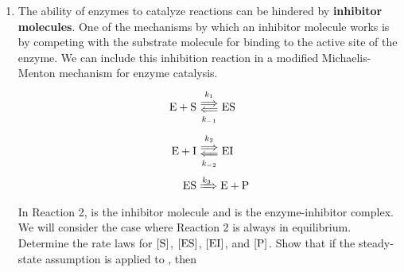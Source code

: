 \documentclass[../psets.tex]{subfiles}
\begin{document}
\begin{enumerate}[label={\textbf{29-\arabic*.}},leftmargin=3.5em]
\begin{proof}[Answer]
\begin{align*}
            \dv{\cnc{HBr}}{t} &= k_2\cnc{Br}\cnc{H2}-k_{-2}\cnc{HBr}\cnc{H}+k_3\cnc{H}\cnc{Br2}\\
            &= k_2\left( \frac{2I_\text{abs}}{k_{-1}\NA} \right)^{1/2}\cnc{H2}-(k_{-2}\cnc{HBr}-k_3\cnc{Br2})\left( \frac{2I_\text{abs}}{k_{-1}\NA} \right)^{1/2}\frac{k_2\cnc{H2}}{k_{-2}\cnc{HBr}+k_3\cnc{Br2}}\\
            &= k_2\left( \frac{2I_\text{abs}}{k_{-1}\NA} \right)^{1/2}\cnc{H2}\left\{ 1-\frac{k_{-2}\cnc{HBr}-k_3\cnc{Br2}}{k_{-2}\cnc{HBr}+k_3\cnc{Br2}} \right\}\\
            &= k_2\left( \frac{2I_\text{abs}}{k_{-1}\NA} \right)^{1/2}\cnc{H2}\left\{ \frac{k_{-2}\cnc{HBr}+k_3\cnc{Br2}}{k_{-2}\cnc{HBr}+k_3\cnc{Br2}}-\frac{k_{-2}\cnc{HBr}-k_3\cnc{Br2}}{k_{-2}\cnc{HBr}+k_3\cnc{Br2}} \right\}\\
            &= k_2\left( \frac{2I_\text{abs}}{k_{-1}\NA} \right)^{1/2}\cnc{H2}\left\{ \frac{2k_3\cnc{Br2}}{k_{-2}\cnc{HBr}+k_3\cnc{Br2}} \right\}\\
            \Aboxed{\dv{\cnc{HBr}}{t} &= \left( \frac{2I_\text{abs}}{k_{-1}\NA} \right)^{1/2}\frac{2k_2\cnc{H2}}{(k_{-2}/k_3)\cnc{HBr}/\cnc{Br2}+1}}
        \end{align*}
        where we have arranged the last expression so that every molar concentration and rate constant appears at most once, increasing the clarity with which the reader can see what's proportional to what.
    \end{proof}
    \item The ability of enzymes to catalyze reactions can be hindered by \textbf{inhibitor molecules}. One of the mechanisms by which an inhibitor molecule works is by competing with the substrate molecule for binding to the active site of the enzyme. We can include this inhibition reaction in a modified Michaelis-Menton mechanism for enzyme catalysis.
    \begin{align}
        \ce{E + S} &\Longleftrightarrows[k_1][k_{-1}] \ce{ES}\\
        \ce{E + I} &\Longleftrightarrows[k_2][k_{-2}] \ce{EI}\\
        \ce{ES} &\xRightarrow{k_3} \ce{E + P}
    \end{align}
    In Reaction 2,  is the inhibitor molecule and  is the enzyme-inhibitor complex. We will consider the case where Reaction 2 is always in equilibrium. Determine the rate laws for $\cnc{S}$, $\cnc{ES}$, $\cnc{EI}$, and $\cnc{P}$. Show that if the steady-state assumption is applied to , then

\end{enumerate}
\end{document}
